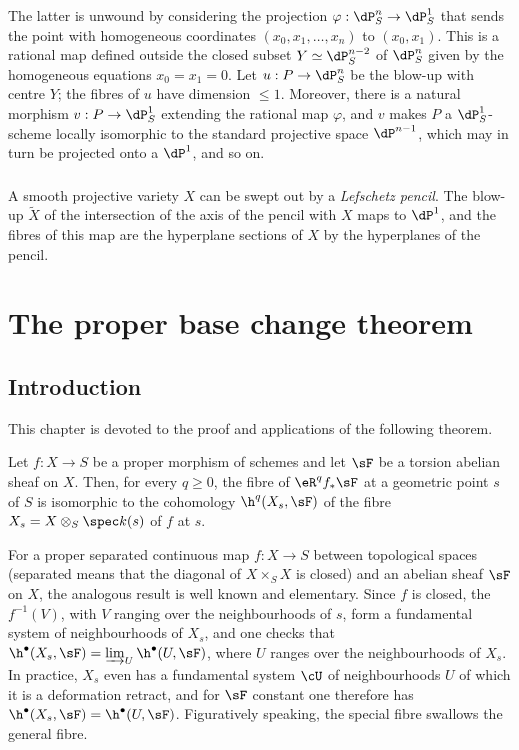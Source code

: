 \documentclass[oneside]{book}
\begin{document}
The latter is unwound by considering the projection
$\varphi:\dP_S^n\to\dP_S^1$ that sends the point with homogeneous
coordinates $(x_0,x_1,\dotsc,x_n)$ to $(x_0,x_1)$. This is a rational
map defined outside the closed subset $Y\simeq\dP_S^{n-2}$ of
$\dP_S^n$ given by the homogeneous equations $x_0=x_1=0$. Let
$u:P\to\dP_S^n$ be the blow-up with centre $Y$; the fibres of $u$ have
dimension $\leqslant1$. Moreover, there is a natural morphism
$v:P\to\dP_S^1$ extending the rational map $\varphi$, and $v$ makes
$P$ a $\dP_S^1$-scheme locally isomorphic to the standard projective
space $\dP^{n-1}$, which may in turn be projected onto a $\dP^1$, and
so on.

\subsubsection{}\label{I:3-4-4}

A smooth projective variety $X$ can be swept out by a
\emph{Lefschetz pencil}. The blow-up $\widetilde X$ of the intersection
of the axis of the pencil with $X$ maps to $\dP^1$, and the fibres of
this map are the hyperplane sections of $X$ by the hyperplanes of the
pencil.

\section{The proper base change theorem}\label{I:4}

\subsection{Introduction}\label{I:4-1}

This chapter is devoted to the proof and applications of the following
theorem.

\begin{theorem}\label{I:4-1-1}
Let $f:X\to S$ be a proper morphism of schemes and let $\sF$ be a
torsion abelian sheaf on $X$. Then, for every $q\geqslant0$, the fibre
of $\eR^qf_*\sF$ at a geometric point $s$ of $S$ is isomorphic to the
cohomology $\h^q(X_s,\sF)$ of the fibre
$X_s=X\otimes_S\spec k(s)$ of $f$ at $s$.
\end{theorem}

For a proper separated continuous map $f:X\to S$ between topological
spaces (separated means that the diagonal of $X\times_SX$ is closed) and
an abelian sheaf $\sF$ on $X$, the analogous result is well known and
elementary. Since $f$ is closed, the $f^{-1}(V)$, with $V$ ranging over
the neighbourhoods of $s$, form a fundamental system of neighbourhoods
of $X_s$, and one checks that
$\h^\bullet(X_s,\sF)=\varinjlim_U\h^\bullet(U,\sF)$, where $U$ ranges
over the neighbourhoods of $X_s$. In practice, $X_s$ even has a
fundamental system $\cU$ of neighbourhoods $U$ of which it is a
deformation retract, and for $\sF$ constant one therefore has
$\h^\bullet(X_s,\sF)=\h^\bullet(U,\sF)$. Figuratively speaking, the
special fibre swallows the general fibre.
\end{document}
